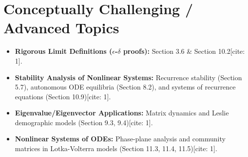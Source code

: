 \documentclass[10pt, letterpaper]{article}
\begin{document}
\section{Conceptually Challenging / Advanced Topics}
\begin{itemize}[leftmargin=*]
    \item \textbf{Rigorous Limit Definitions ($\epsilon$-$\delta$ proofs):} Section 3.6 \& Section 10.2[cite: 1].
    \item \textbf{Stability Analysis of Nonlinear Systems:} Recurrence stability (Section 5.7), autonomous ODE equilibria (Section 8.2), and systems of recurrence equations (Section 10.9)[cite: 1].
    \item \textbf{Eigenvalue/Eigenvector Applications:} Matrix dynamics and Leslie demographic models (Section 9.3, 9.4)[cite: 1].
    \item \textbf{Nonlinear Systems of ODEs:} Phase-plane analysis and community matrices in Lotka-Volterra models (Section 11.3, 11.4, 11.5)[cite: 1].
\end{itemize}
\end{document}
